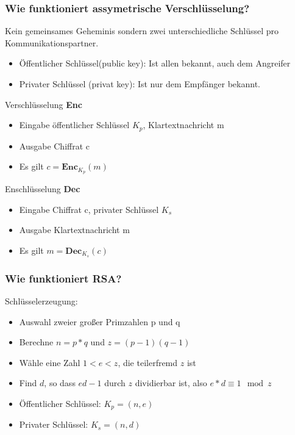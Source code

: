 	\subsubsection{Wie funktioniert assymetrische Verschlüsselung?}
	Kein gemeinsames Geheminis sondern zwei unterschiedliche Schlüssel pro Kommunikationspartner. 
	\begin{itemize}
		\item Öffentlicher Schlüssel(public key): Ist allen bekannt, auch dem Angreifer
		\item Privater Schlüssel (privat key): Ist nur dem Empfänger bekannt. 
	\end{itemize}
	
	Verschlüsselung \textbf{Enc}
		\begin{itemize}
			\item Eingabe öffentlicher Schlüssel $K_p$, Klartextnachricht m
			\item Ausgabe Chiffrat c
			\item Es gilt $c=\textbf{Enc}_{K_p}(m)$
		\end{itemize}
		
	Enschlüsselung \textbf{Dec}
		\begin{itemize}
			\item Eingabe Chiffrat c, privater Schlüssel $K_s$
			\item Ausgabe Klartextnachricht m
			\item Es gilt $m=\textbf{Dec}_{K_s}(c)$
		\end{itemize}
		
	\subsubsection{Wie funktioniert RSA?}
	Schlüsselerzeugung:	
	\begin{itemize}
		\item Auswahl zweier großer Primzahlen p und q
		\item Berechne $n = p*q$ und $z=(p-1)(q-1)$
		\item Wähle eine Zahl $1<e<z$, die teilerfremd $z$ ist
		\item Find $d$, so dass $ed -1$ durch $z$ dividierbar ist, also $e*d \equiv 1 \mod z$
		\item Öffentlicher Schlüssel: $K_p = (n,e)$
		\item Privater Schlüssel: $K_s = (n,d)$
	\end{itemize}
	
